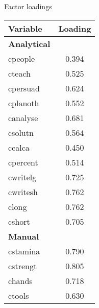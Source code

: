 \begin{center}
\begin{threeparttable}[!h]
\caption{Factor loadings}
\label{tab:loadingTable}
\begin{tabular}{lc}
\toprule
\toprule
\textbf{Variable}&\multicolumn{1}{c}{\textbf{Loading}} \\
\midrule
 \textbf{Analytical} \\
cpeople     &       0.394\\
cteach      &       0.525\\
cpersuad    &       0.624\\
cplanoth    &       0.552\\
canalyse    &       0.681\\
csolutn     &       0.564\\
ccalca      &       0.450\\
cpercent    &       0.514\\
cwritelg    &       0.725\\
cwritesh    &       0.762\\
clong       &       0.762\\
cshort      &       0.705\\
 \textbf{Manual} \\
cstamina    &       0.790\\
cstrengt    &       0.805\\
chands      &       0.718\\
ctools      &       0.630\\
\bottomrule
\bottomrule
\end{tabular}
\end{threeparttable}
\end{center}

